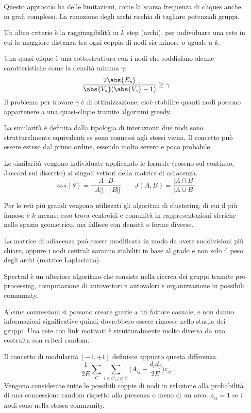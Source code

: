 Questo approccio ha delle limitazioni, come la scarsa frequenza di cliques anche in grafi complessi. La rimozione degli archi rischia di tagliare potenziali gruppi. 

Un altro criterio è la raggiungibilità in $k$ step (archi), per individuare una rete in cui la maggiore distanza tra ogni coppia di nodi sia minore o uguale a $k$. 

Una quasi-clique è una sottostruttura con i nodi che soddisfano alcune caratteristiche come la densità minima $\gamma$:
$$\frac{2\abs{E_s}}{\abs{V_s}(\abs{V_s} - 1)} \geq \gamma$$
Il problema per trovare $\gamma$ è di ottimizzazione, cioè stabilire quanti 
nodi possono appartenere a una quasi-clique tramite algoritmi greedy.

La similarità è definita dalla tipologia di interazioni: due nodi sono strutturalmente equivalenti se sono connessi agli stessi vicini. Il concetto può essere esteso dal primo ordine, essendo molto severo e poco probabile. 

Le similarità vengono individuate applicando le formule (coseno sul continuo, Jaccard sul discreto) ai singoli vettori della matrice di adiacenza. 
$$cos(\theta) = \frac{A \cdot B}{||A|| \cdot ||B||} \qquad J(A, B) = \frac{|A \cap B|}{|A \cup B|}$$

Per le reti più grandi vengono utilizzati gli algoritmi di clustering, di cui il più famoso è $k$-means: esso trova centroidi e comunità in rappresentazioni sferiche nello spazio geometrico, ma fallisce con densità o forme diverse. 

La matrice di adiacenza può essere modificata in modo da avere suddivisioni più chiare, oppure i nodi centrali saranno stabiliti in base al grado e non solo il peso degli archi (matrice Laplaciana).

Spectral è un ulteriore algoritmo che consiste nella ricerca dei gruppi tramite pre-processing, computazione di autovettori e autovalori e organizzazione in possibili community. 

Alcune connessioni si possono creare grazie a un fattore casuale, e non danno informazioni significative quindi dovrebbero essere rimosse nello studio dei gruppi. Una rete con link motivati è strutturalmente molto diversa da una costruita con criteri random.

Il concetto di modularità $[-1, +1]$  definisce appunto questa differenza. 
$$\frac{1}{2E} \sum_{C} \sum_{i \in C, j \in C} \Big(A_{ij} - \frac{d_id_j}{2E}\Big) z_{ij}$$
Vengono considerate tutte le possibili coppie di nodi in relazione alla probabilità di una connessione random rispetto alla presenza o meno di un arco. $z_{ij} = 1$ se i nodi sono nella stessa community.

